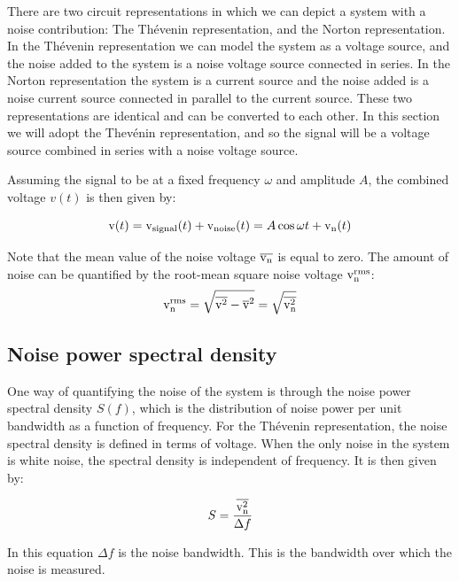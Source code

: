 There are two circuit representations in which we can depict a system with a noise contribution: The Th\'evenin representation, and the Norton representation. In the Th\'evenin representation we can model the system as a voltage source, and the noise added to the system is a noise voltage source connected in series. In the Norton representation the system is a current source and the noise added is a noise current source connected in parallel to the current source. These two representations are identical and can be converted to each other. In this section we will adopt the Thev\'enin representation, and so the signal will be a voltage source combined in series with a noise voltage source.

Assuming the signal to be at a fixed frequency $\omega$ and amplitude $A$, the combined voltage $v(t)$ is then given by:

\begin{equation}
    \text{v}(t) = \text{v}_\text{signal}(t) + \text{v}_\text{noise}(t) = A \cos{\omega t} + \text{v}_\text{n}(t)
\end{equation}

Note that the mean value of the noise voltage $\overline{\text{v}_\text{n}}$ is equal to zero. The amount of noise can be quantified by the root-mean square noise voltage $\text{v}_\text{n}^\text{rms}$:
\begin{equation}
    \text{v}_\text{n}^\text{rms} = \sqrt{\overline{\text{v}^2} - \overline{\text{v}}^2} = \sqrt{\overline{\text{v}_\text{n}^2}}
    \label{eqn:v_rms}
\end{equation}

\subsection{Noise power spectral density}

One way of quantifying the noise of the system is through the noise power spectral density $S(f)$, which is the distribution of noise power per unit bandwidth as a function of frequency. For the Th\'evenin representation, the noise spectral density is defined in terms of voltage. When the only noise in the system is white noise, the spectral density is independent of frequency. It is then given by:

\begin{equation}
    S = \frac{\vsq}{\Delta f}
    \tagaddtext{[\si[per-mode=symbol]{\volt \squared \per \hertz}]}
    \label{eqn:noise spectral density definition}
\end{equation}

In this equation $\Delta f$ is the noise bandwidth. This is the bandwidth over which the noise is measured.


